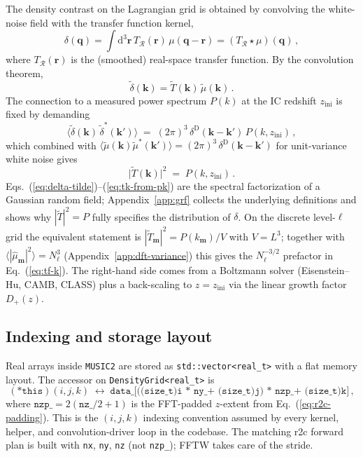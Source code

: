 \documentclass[12pt]{article}
\newcommand{\bk}{\mathbf{k}}
\newcommand{\bq}{\mathbf{q}}
\newcommand{\bm}{\mathbf{m}}
\newcommand{\br}{\mathbf{r}}
\newcommand{\code}[1]{\texttt{#1}}
\begin{document}
The density contrast on the Lagrangian grid is obtained by
convolving the white-noise field with the transfer function kernel,
\begin{equation}
  \delta(\bq) = \int \mathrm{d}^3\br\,T_\mathcal{R}(\br)\,\mu(\bq - \br)
              = (T_\mathcal{R} \star \mu)(\bq)\,,
  \label{eq:delta-conv}
\end{equation}
where $T_\mathcal{R}(\br)$ is the (smoothed) real-space transfer
function.  By the convolution theorem,
\begin{equation}
  \tilde\delta(\bk) = \tilde T(\bk)\,\tilde\mu(\bk)\,.
  \label{eq:delta-tilde}
\end{equation}
The connection to a measured power spectrum $P(k)$ at the IC redshift
$z_\mathrm{ini}$ is fixed by demanding
\begin{equation}
  \bigl\langle \tilde\delta(\bk)\,\tilde\delta^*(\bk') \bigr\rangle
   \;=\; (2\pi)^3\,\delta^\mathrm{D}(\bk - \bk')\,P(k, z_\mathrm{ini})\,,
  \label{eq:Pk-def}
\end{equation}
which combined with $\langle\tilde\mu(\bk)\tilde\mu^*(\bk')\rangle =
(2\pi)^3\,\delta^\mathrm{D}(\bk-\bk')$ for unit-variance white noise
gives
\begin{equation}
  \bigl|\tilde T(\bk)\bigr|^2 \;=\; P(k, z_\mathrm{ini})\,.
  \label{eq:tk-from-pk}
\end{equation}
Eqs.~(\ref{eq:delta-tilde})--(\ref{eq:tk-from-pk}) are the spectral
factorization of a Gaussian random field;
Appendix~\ref{app:grf} collects the underlying definitions and
shows why $|\tilde T|^2 = P$ fully specifies the distribution of
$\delta$.
On the discrete level-$\ell$ grid the equivalent statement is
$|\tilde T_\bm|^2 = P(k_\bm)/V$ with $V = L^3$; together with
$\langle|\hat\mu_\bm|^2\rangle = N_\ell^3$ (Appendix~\ref{app:dft-variance})
this gives the $N_\ell^{-3/2}$ prefactor in Eq.~(\ref{eq:tf-k}).
The right-hand side comes from a Boltzmann solver (Eisenstein--Hu,
CAMB, CLASS) plus a back-scaling to $z = z_\mathrm{ini}$ via the
linear growth factor $D_+(z)$.

\subsection{Indexing and storage layout}
\label{sec:notation-storage}

Real arrays inside \texttt{MUSIC2} are stored as
\code{std::vector<real\_t>} with a flat memory layout.  The accessor
on \code{DensityGrid<real\_t>} is
\begin{equation}
  (\code{*this})(i, j, k)
     \;\longleftrightarrow\;
     \code{data\_[((size\_t)i * ny\_ + (size\_t)j) * nzp\_ + (size\_t)k]}\,,
  \label{eq:densitygrid-access}
\end{equation}
where $\code{nzp\_} = 2(\code{nz\_}/2 + 1)$ is the FFT-padded
$z$-extent from Eq.~(\ref{eq:r2c-padding}).  This is the
$(i, j, k)$ indexing convention assumed by every kernel, helper, and
convolution-driver loop in the codebase.  The matching r2c forward
plan is built with \code{nx}, \code{ny}, \code{nz} (not \code{nzp\_});
FFTW takes care of the stride.
\end{document}
